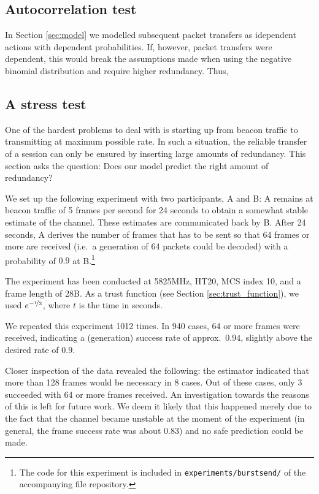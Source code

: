 \documentclass[10pt,a4paper]{article}
\begin{document}
\subsection{Autocorrelation test}
In Section \ref{sec:model} we modelled subsequent packet transfers as idependent actions with dependent probabilities.
If, however, packet transfers were dependent, this would break the assumptions made when using the negative binomial distribution and require higher redundancy.
Thus, 

\subsection{A stress test}
One of the hardest problems to deal with is starting up from beacon traffic to transmitting at maximum possible rate. 
In such a situation, the reliable transfer of a session can only be ensured by inserting large amounts of redundancy.
This section asks the question: Does our model predict the right amount of redundancy?

We set up the following experiment with two participants, A and B:
A remains at beacon traffic of 5 frames per second for 24 seconds to obtain a somewhat stable estimate of the channel.
These estimates are communicated back by B.
After 24 seconds, A derives the number of frames that has to be sent so that 64 frames or more are received (i.e.\ a generation of 64 packets could be decoded) with a probability of $0.9$ at B.\footnote{The code for this experiment is included in \texttt{experiments/burstsend/} of the accompanying file repository.}

The experiment has been conducted at 5825MHz, HT20, MCS index 10, and a frame length of 28B.
As a trust function (see Section \ref{sec:trust_function}), we used $e^{-\nicefrac{t}{3}}$, where $t$ is the time in seconds.

We repeated this experiment 1012 times.
In 940 cases, 64 or more frames were received, indicating a (generation) success rate of approx.\ $0.94$, slightly above the desired rate of $0.9$.

Closer inspection of the data revealed the following:
the estimator indicated that more than 128 frames would be necessary in 8 cases.
Out of these cases, only 3 succeeded with 64 or more frames received.
An investigation towards the reasons of this is left for future work.
We deem it likely that this happened merely due to the fact that the channel became unstable at the moment of the experiment (in general, the frame success rate was about $0.83$) and no safe prediction could be made.
\end{document}
